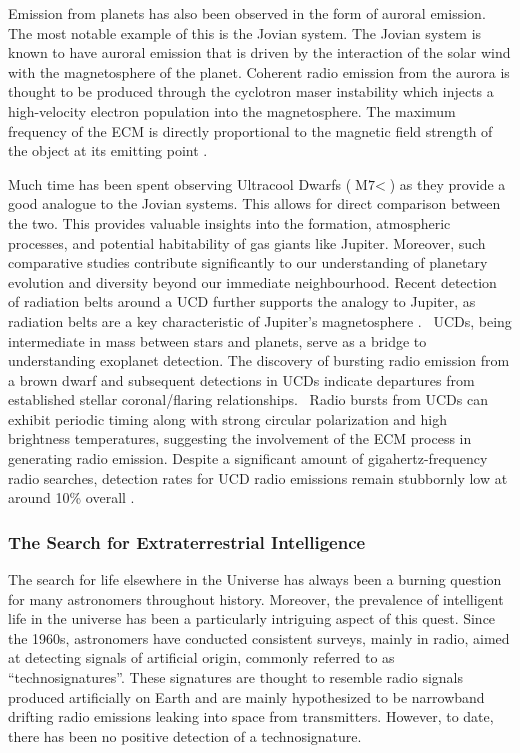 Emission from planets has also been observed in the form of auroral emission. The most notable example of this is the Jovian system. The Jovian system is known to have auroral emission that is driven by the interaction of the solar wind with the magnetosphere of the planet. Coherent radio emission from the aurora is thought to be produced through the cyclotron maser instability \citep[ECM;][]{zarka_auroral_1998} which injects a high-velocity electron population into the magnetosphere. The maximum frequency of the ECM is directly proportional to the magnetic field strength of the object at its emitting point \citep{kavanagh_hunting_2023, joe_nature_review}.

Much time has been spent observing Ultracool Dwarfs ($\text{M7} <$) as they provide a good analogue to the Jovian systems. This allows for direct comparison between the two.  This provides valuable insights into the formation, atmospheric processes, and potential habitability of gas giants like Jupiter. Moreover, such comparative studies contribute significantly to our understanding of planetary evolution and diversity beyond our immediate neighbourhood. Recent detection of radiation belts around a UCD further supports the analogy to Jupiter, as radiation belts are a key characteristic of Jupiter's magnetosphere \citep{joe_nature_review}. \ UCDs, being intermediate in mass between stars and planets, serve as a bridge to understanding exoplanet detection. The discovery of bursting radio emission from a brown dwarf and subsequent detections in UCDs indicate departures from established stellar coronal/flaring relationships. \ Radio bursts from UCDs can exhibit periodic timing \citep{hallinan_rotational_2006} along with strong circular polarization and high brightness temperatures, suggesting the involvement of the ECM process in generating radio emission. Despite a significant amount of gigahertz-frequency radio searches, detection rates for UCD radio emissions remain stubbornly low at around 10\% overall \citep{lynch_radio_2016}.


\subsubsection{The Search for Extraterrestrial Intelligence} \label{sec:SETI-th}

The search for life elsewhere in the Universe has always been a burning question for many astronomers throughout history. Moreover, the prevalence of intelligent life in the universe has been a particularly intriguing aspect of this quest. Since the 1960s, astronomers have conducted consistent surveys, mainly in radio, aimed at detecting signals of artificial origin, commonly referred to as ``technosignatures''. These signatures are thought to resemble radio signals produced artificially on Earth and are mainly hypothesized to be narrowband drifting radio emissions leaking into space from transmitters. However, to date, there has been no positive detection of a technosignature. \ 

